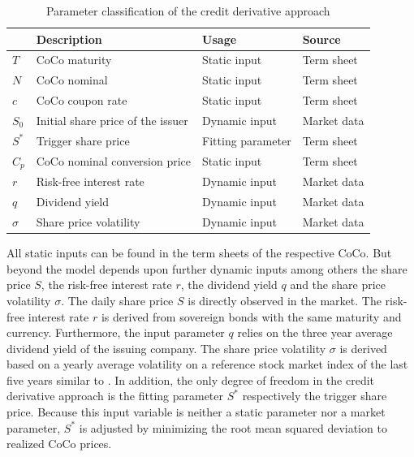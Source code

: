 \begin{table}[H]
	\setlength{\extrarowheight}{2.5pt}
	\centering
	\begin{tabular}{llll}
		\toprule
			 & \textbf{Description} & \textbf{Usage} & \textbf{Source} \\
		\midrule
			$T$ & CoCo maturity & Static input & Term sheet \\
			$N$ & CoCo nominal & Static input & Term sheet \\			
			$c$ & CoCo coupon rate & Static input & Term sheet \\
			$S_0$ & Initial share price of the issuer & Dynamic input & Market data \\
			$S^*$ & Trigger share price & Fitting parameter & Term sheet \\
			$C_p$ & CoCo nominal conversion price & Static input & Term sheet \\
			$r$ & Risk-free interest rate & Dynamic input & Market data \\
			$q$ & Dividend yield & Dynamic input & Market data\\
			$\sigma$& Share price volatility & Dynamic input & Market data \\
		\bottomrule
	\end{tabular}
	\caption[Parameter classification of the credit derivative approach]{Parameter classification of the credit derivative approach \citep{wilkens2014contingent}}
	\label{creditparameters}
\end{table}

All static inputs can be found in the term sheets of the respective CoCo. But beyond the model depends upon further dynamic inputs among others the share price $S$, the risk-free interest rate $r$, the dividend yield $q$ and the share price volatility $\sigma$. The daily share price $S$ is directly observed in the market. The risk-free interest rate $r$ is derived from sovereign bonds with the same maturity and currency. Furthermore, the input parameter $q$ relies on the three year average dividend yield of the issuing company. The share price volatility $\sigma$ is derived based on a yearly average volatility on a reference stock market index of the last five years similar to \citet{alvemar2012modelling}. In addition, the only degree of freedom in the credit derivative approach is the fitting parameter $S^*$ respectively the trigger share price. Because this input variable is neither a static parameter nor a market parameter, $S^*$ is adjusted by minimizing the root mean squared deviation to realized CoCo prices. \citep{erismann2011analytical}

